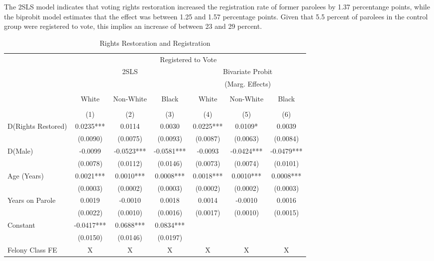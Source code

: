 \documentclass[
  12pt,
]{article}
\begin{document}
The 2SLS model indicates that voting rights restoration increased the registration rate of former parolees by 1.37 percentange points, while the biprobit model estimates that the effect was between 1.25 and 1.57 percentage points. Given that 5.5 percent of parolees in the control group were registered to vote, this implies an increase of between 23 and 29 percent.

\begin{singlespace}
\begin{table}[H]
\caption{\label{tab:iv-models-r-chunk}\label{tab:iv-models-r} Rights Restoration and Registration}
\fontsize{10}{12}\selectfont
\centering

\begin{tabular}{lcccccc}
\\[-1.8ex]\hline
& \multicolumn{6}{c}{Registered to Vote} \\
& \multicolumn{3}{c}{2SLS} &  \multicolumn{3}{c}{Bivariate Probit}\\
& & & &   \multicolumn{3}{c}{(Marg. Effects)}\\
\cmidrule(l{3pt}r{3pt}){2-4} \cmidrule(l{3pt}r{3pt}){5-7}
\\[-1.8ex] & White & Non-White & Black& White & Non-White & Black\\
\\[-1.8ex] & (1) & (2) & (3) & (4) & (5) & (6)\\
\hline
D(Rights Restored) & 0.0235*** & 0.0114 & 0.0030 & 0.0225*** & 0.0109* & 0.0039 \\
 & (0.0090) & (0.0075) & (0.0093) & (0.0087) & (0.0063) & (0.0084) \\
D(Male) & -0.0099 & -0.0523*** & -0.0581*** & -0.0093 & -0.0424*** & -0.0479*** \\
 & (0.0078) & (0.0112) & (0.0146) & (0.0073) & (0.0074) & (0.0101) \\
Age (Years) & 0.0021*** & 0.0010*** & 0.0008*** & 0.0018*** & 0.0010*** & 0.0008*** \\
 & (0.0003) & (0.0002) & (0.0003) & (0.0002) & (0.0002) & (0.0003) \\
Years on Parole & 0.0019 & -0.0010 & 0.0018 & 0.0014 & -0.0010 & 0.0016 \\
 & (0.0022) & (0.0010) & (0.0016) & (0.0017) & (0.0010) & (0.0015) \\
Constant & -0.0417*** & 0.0688*** & 0.0834*** &  &  &  \\
 & (0.0150) & (0.0146) & (0.0197) &  &  &  \\
\hline
Felony Class FE & X & X & X & X & X & X \\

\end{tabular}
\end{table}
\end{singlespace}
\end{document}
